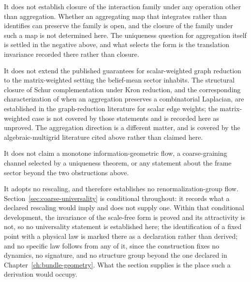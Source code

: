 It does not establish closure of the interaction family under any operation other than aggregation. Whether an aggregating map that integrates rather than identifies can preserve the family is open, and the closure of the family under such a map is not determined here. The uniqueness question for aggregation itself is settled in the negative above, and what selects the form is the translation invariance recorded there rather than closure.

It does not extend the published guarantees for scalar-weighted graph reduction to the matrix-weighted setting the belief-mean sector inhabits. The structural closure of Schur complementation under Kron reduction, and the corresponding characterization of when an aggregation preserves a combinatorial Laplacian, are established in the graph-reduction literature for scalar edge weights; the matrix-weighted case is not covered by those statements and is recorded here as unproved. The aggregation direction is a different matter, and is covered by the algebraic-multigrid literature cited above rather than claimed here.

It does not claim a monotone information-geometric flow, a coarse-graining channel selected by a uniqueness theorem, or any statement about the frame sector beyond the two obstructions above.

It adopts no rescaling, and therefore establishes no renormalization-group flow. Section~\ref{sec:coarse-universality} is conditional throughout: it records what a declared rescaling would imply and does not supply one. Within that conditional development, the invariance of the scale-free form is proved and its attractivity is not, so no universality statement is established here; the identification of a fixed point with a physical law is marked there as a declaration rather than derived; and no specific law follows from any of it, since the construction fixes no dynamics, no signature, and no structure group beyond the one declared in Chapter~\ref{ch:bundle-geometry}. What the section supplies is the place such a derivation would occupy.
